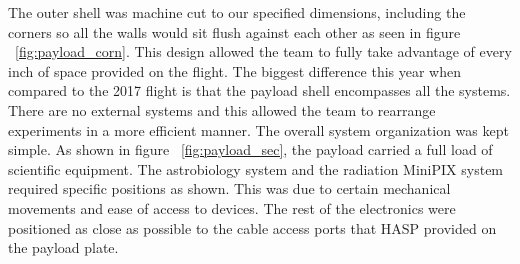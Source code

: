 The outer shell was machine cut to our specified dimensions, including the corners so all the walls would sit flush against each other as seen in figure ~\ref{fig:payload_corn}.  This design allowed the team to fully take advantage of every inch of space provided on the flight.  The biggest difference this year when compared to the 2017 flight is that the payload shell encompasses all the systems.  There are no external systems and this allowed the team to rearrange experiments in a more efficient manner.
The overall system organization was kept simple.  As shown in figure ~\ref{fig:payload_sec}, the payload carried a full load of scientific equipment.  The astrobiology system and the radiation MiniPIX system required specific positions as shown.  This was due to certain mechanical movements and ease of access to devices.  The rest of the electronics were positioned as close as possible to the cable access ports that HASP provided on the payload plate.


